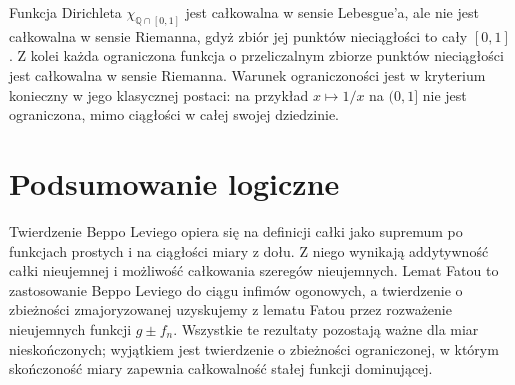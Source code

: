 \begin{uwaga}
Funkcja Dirichleta $\chi_{\mathbb Q\cap[0,1]}$
jest całkowalna w sensie Lebesgue'a, ale
nie jest całkowalna w sensie Riemanna, gdyż
zbiór jej punktów nieciągłości to cały $[0,1]$.
Z kolei każda ograniczona funkcja o przeliczalnym
zbiorze punktów nieciągłości jest całkowalna
w sensie Riemanna. Warunek ograniczoności jest
w kryterium konieczny w jego klasycznej postaci:
na przykład $x\mapsto1/x$ na $(0,1]$ nie jest
ograniczona, mimo ciągłości w całej swojej dziedzinie.
\end{uwaga}

\section{Podsumowanie logiczne}

Twierdzenie Beppo Leviego opiera się na definicji
całki jako supremum po funkcjach prostych i na
ciągłości miary z dołu. Z niego wynikają
addytywność całki nieujemnej i możliwość całkowania
szeregów nieujemnych. Lemat Fatou to zastosowanie
Beppo Leviego do ciągu infimów ogonowych, a twierdzenie
o zbieżności zmajoryzowanej uzyskujemy z lematu Fatou
przez rozważenie nieujemnych funkcji $g\pm f_n$.
Wszystkie te rezultaty pozostają ważne dla miar
nieskończonych; wyjątkiem jest twierdzenie o zbieżności
ograniczonej, w którym skończoność miary
zapewnia całkowalność stałej funkcji dominującej.

